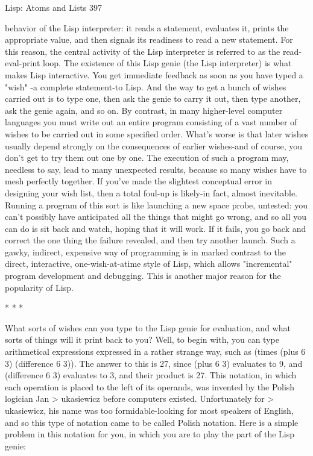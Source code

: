 Lisp: Atoms and Lists                                                                   397

behavior of the Lisp interpreter: it reads a statement, evaluates it, prints the
appropriate value, and then signals its readiness to read a new statement. For this
reason, the central activity of the Lisp interpreter is referred to as the read-eval-print
loop.
        The existence of this Lisp genie (the Lisp interpreter) is what makes Lisp
interactive. You get immediate feedback as soon as you have typed a "wish" -a
complete statement-to Lisp. And the way to get a bunch of wishes carried out is to
type one, then ask the genie to carry it out, then type another, ask the genie again, and
so on.
        By contrast, in many higher-level computer languages you must write out an
entire program consisting of a vast number of wishes to be carried out in some
specified order. What's worse is that later wishes usually depend strongly on the
consequences of earlier wishes-and of course, you don't get to try them out one by
one. The execution of such a program may, needless to say, lead to many unexpected
results, because so many wishes have to mesh perfectly together. If you've made the
slightest conceptual error in designing your wish list, then a total foul-up is likely-in
fact, almost inevitable. Running a program of this sort is like launching a new space
probe, untested: you can't possibly have anticipated all the things that might go
wrong, and so all you can do is sit back and watch, hoping that it will work. If it fails,
you go back and correct the one thing the failure revealed, and then try another
launch. Such a gawky, indirect, expensive way of programming is in marked contrast
to the direct, interactive, one-wish-at-atime style of Lisp, which allows "incremental"
program development and debugging. This is another major reason for the popularity
of Lisp.

                                        *   *   *

        What sorts of wishes can you type to the Lisp genie for evaluation, and what
sorts of things will it print back to you? Well, to begin with, you can type arithmetical
expressions expressed in a rather strange way, such as (times (plus 6 3) (difference 6
3)). The answer to this is 27, since (plus 6 3) evaluates to 9, and (difference 6 3)
evaluates to 3, and their product is 27. This notation, in which each operation is
placed to the left of its operands, was invented by the Polish logician Jan >
ukasiewicz before computers existed. Unfortunately for > ukasiewicz, his name was
too formidable-looking for most speakers of English, and so this type of notation
came to be called Polish notation. Here is a simple problem in this notation for you, in
which you are to play the part of the Lisp genie:

